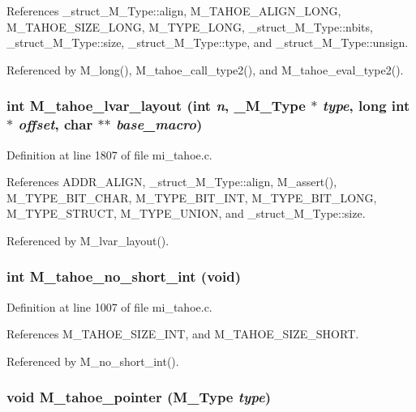 References \_\-struct\_\-M\_\-Type::align, M\_\-TAHOE\_\-ALIGN\_\-LONG, M\_\-TAHOE\_\-SIZE\_\-LONG, M\_\-TYPE\_\-LONG, \_\-struct\_\-M\_\-Type::nbits, \_\-struct\_\-M\_\-Type::size, \_\-struct\_\-M\_\-Type::type, and \_\-struct\_\-M\_\-Type::unsign.

Referenced by M\_\-long(), M\_\-tahoe\_\-call\_\-type2(), and M\_\-tahoe\_\-eval\_\-type2().
\subsubsection{\setlength{\rightskip}{0pt plus 5cm}int M\_\-tahoe\_\-lvar\_\-layout (int {\em n}, \bf{\_\-M\_\-Type} $\ast$ {\em type}, long int $\ast$ {\em offset}, char $\ast$$\ast$ {\em base\_\-macro})}\label{mi__tahoe_8c_83c5ea1a62433d6e2994b47ce9678e3f}




Definition at line 1807 of file mi\_\-tahoe.c.

References ADDR\_\-ALIGN, \_\-struct\_\-M\_\-Type::align, M\_\-assert(), M\_\-TYPE\_\-BIT\_\-CHAR, M\_\-TYPE\_\-BIT\_\-INT, M\_\-TYPE\_\-BIT\_\-LONG, M\_\-TYPE\_\-STRUCT, M\_\-TYPE\_\-UNION, and \_\-struct\_\-M\_\-Type::size.

Referenced by M\_\-lvar\_\-layout().
\subsubsection{\setlength{\rightskip}{0pt plus 5cm}int M\_\-tahoe\_\-no\_\-short\_\-int (void)}\label{mi__tahoe_8c_bae6101c8131e2457900459863c3a0be}




Definition at line 1007 of file mi\_\-tahoe.c.

References M\_\-TAHOE\_\-SIZE\_\-INT, and M\_\-TAHOE\_\-SIZE\_\-SHORT.

Referenced by M\_\-no\_\-short\_\-int().
\subsubsection{\setlength{\rightskip}{0pt plus 5cm}void M\_\-tahoe\_\-pointer (\bf{M\_\-Type} {\em type})}\label{mi__tahoe_8c_431c118d6346f0cda63defbdf30c303d}




